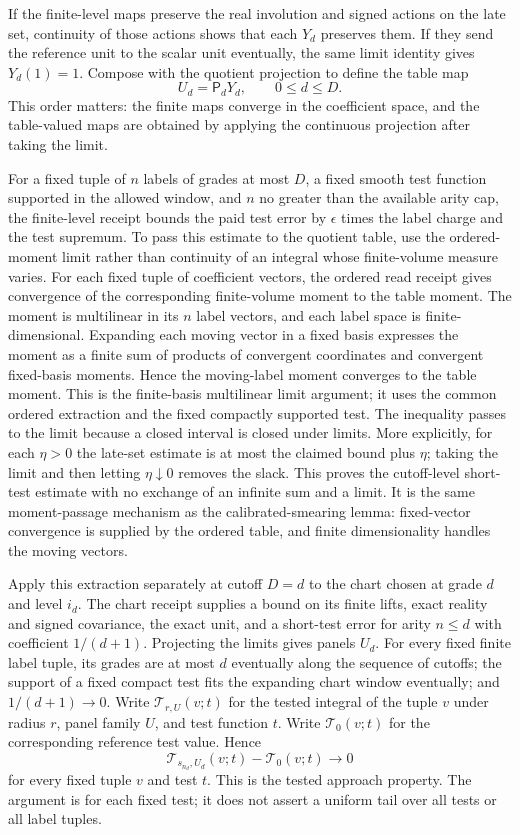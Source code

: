 If the finite-level maps preserve the real involution and signed actions on
the late set, continuity of those actions shows that each $Y_d$ preserves
them. If they send the reference unit to the scalar unit eventually, the
same limit identity gives $Y_d(1)=1$. Compose with the quotient projection
to define the table map
\[
 U_d=\mathsf P_dY_d,\qquad 0\leq d\leq D.
\]
This order matters: the finite maps converge in the coefficient space, and
the table-valued maps are obtained by applying the continuous projection
after taking the limit.

For a fixed tuple of $n$ labels of grades at most $D$, a fixed smooth test
function supported in the allowed window, and $n$ no greater than the
available arity cap, the finite-level receipt bounds the paid test error
by $\epsilon$ times the label charge and the test supremum. To pass this
estimate to the quotient table, use the ordered-moment limit rather than
continuity of an integral whose finite-volume measure varies. For each
fixed tuple of coefficient vectors, the ordered read receipt gives
convergence of the corresponding finite-volume moment to the table moment.
The moment is multilinear in its $n$ label vectors, and each label space is
finite-dimensional. Expanding each moving vector in a fixed basis expresses
the moment as a finite sum of products of convergent coordinates and
convergent fixed-basis moments. Hence the moving-label moment converges to
the table moment. This is the finite-basis multilinear limit argument; it
uses the common ordered extraction and the fixed compactly supported test.
The inequality passes to the limit
because a closed interval is closed under limits. More explicitly, for
each $\eta>0$ the late-set estimate is at most the claimed bound plus
$\eta$; taking the limit and then letting $\eta\downarrow0$ removes the
slack. This proves the cutoff-level short-test estimate with no exchange
of an infinite sum and a limit. It is the same moment-passage mechanism as
the calibrated-smearing lemma: fixed-vector convergence is supplied by the
ordered table, and finite dimensionality handles the moving vectors.

Apply this extraction separately at cutoff $D=d$ to the chart chosen at
grade $d$ and level $i_d$. The chart receipt supplies a bound on its finite lifts,
exact reality and signed covariance, the exact unit, and a short-test error
for arity $n\leq d$ with coefficient $1/(d+1)$. Projecting the
limits gives panels $U_d$. For every fixed finite label tuple, its grades
are at most $d$ eventually along the sequence of cutoffs; the support of a
fixed compact test fits the expanding chart window eventually; and
$1/(d+1)\to0$. Write
$\mathcal T_{r,U}(v;t)$ for the tested integral of the tuple $v$ under
radius $r$, panel family $U$, and test function $t$. Write
$\mathcal T_0(v;t)$ for the corresponding reference test value. Hence
\[
 \mathcal T_{s_{n_d},U_d}(v;t)-\mathcal T_{0}(v;t)
 \longrightarrow0
\]
for every fixed tuple $v$ and test $t$. This is the tested approach property.
The argument is for each fixed test; it does not assert a uniform tail over
all tests or all label tuples.

